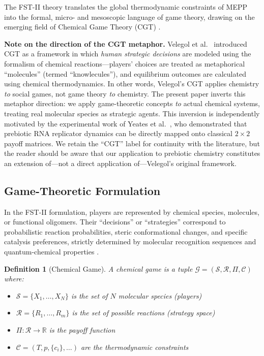 \documentclass[12pt,a4paper]{article}
\newtheorem{definition}{Definition}
\theoremstyle{remark}
\begin{document}
The FST-II theory translates the global thermodynamic constraints of MEPP into the formal, micro- and mesoscopic language of game theory, drawing on the emerging field of Chemical Game Theory (CGT) \citep{CGT2018,CGTMacmillan}.

\textbf{Note on the direction of the CGT metaphor.} Velegol et al.~\citep{CGT2018} introduced CGT as a framework in which \emph{human strategic decisions} are modeled using the formalism of chemical reactions---players' choices are treated as metaphorical ``molecules'' (termed ``knowlecules''), and equilibrium outcomes are calculated using chemical thermodynamics. In other words, Velegol's CGT applies chemistry \emph{to} social games, not game theory \emph{to} chemistry. The present paper inverts this metaphor direction: we apply game-theoretic concepts \emph{to} actual chemical systems, treating real molecular species as strategic agents. This inversion is independently motivated by the experimental work of Yeates et al.~\citep{AzoarcusPNAS}, who demonstrated that prebiotic RNA replicator dynamics can be directly mapped onto classical $2\times 2$ payoff matrices. We retain the ``CGT'' label for continuity with the literature, but the reader should be aware that our application to prebiotic chemistry constitutes an extension of---not a direct application of---Velegol's original framework.

\subsection{Game-Theoretic Formulation}

In the FST-II formulation, players are represented by chemical species, molecules, or functional oligomers. Their ``decisions'' or ``strategies'' correspond to probabilistic reaction probabilities, steric conformational changes, and specific catalysis preferences, strictly determined by molecular recognition sequences and quantum-chemical properties \citep{ThermodynamicSelection}.

\begin{definition}[Chemical Game]
A chemical game is a tuple $\mathcal{G} = (\mathcal{S}, \mathcal{R}, \Pi, \mathcal{C})$ where:
\begin{itemize}
    \item $\mathcal{S} = \{X_1, \ldots, X_N\}$ is the set of $N$ molecular species (players)
    \item $\mathcal{R} = \{R_1, \ldots, R_m\}$ is the set of possible reactions (strategy space)
    \item $\Pi: \mathcal{R} \to \mathbb{R}$ is the payoff function
    \item $\mathcal{C} = (T, p, \{c_i\}, \ldots)$ are the thermodynamic constraints
\end{itemize}
\end{definition}
\end{document}
